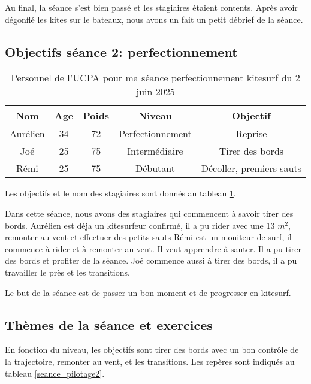 \documentclass[11pt,a4paper]{report}
\begin{document}
Au final, la séance s'est bien passé et les stagiaires étaient contents.
Après avoir dégonflé les kites sur le bateaux, nous avons un fait un
petit débrief de la séance.
\subsection{Objectifs séance 2: perfectionnement}

\begin{table}[h]
\centering
\begin{tabular}{|c|c|c|c|c|}
        \hline
        \textbf{Nom} & \textbf{Age} & \textbf{Poids}& \textbf{Niveau}     &  \textbf{Objectif} \\ 
        \hline
        Aurélien      &  34          &  72           &   Perfectionnement  & Reprise \\
        Joé           &  25          &  75           &   Intermédiaire     & Tirer des bords \\
        Rémi          &  25          & 75            &  Débutant           &  Décoller, premiers sauts  \\
        \hline
\end{tabular}
\caption{Personnel de l'UCPA pour ma séance perfectionnement kitesurf du 2 juin 2025\label{stagiaires_perf}}
\end{table}
Les objectifs et le nom des stagiaires sont donnés au tableau \ref{stagiaires_perf}.

Dans cette séance, nous avons des stagiaires qui commencent à savoir tirer des bords.
Aurélien est déja un kitesurfeur confirmé, il a pu rider avec une 13 $m^2$, 
remonter au vent et effectuer des petits sauts
Rémi est un moniteur de surf, il commence à rider et à remonter au vent. 
Il veut apprendre à sauter.
Il a pu tirer des bords et profiter de la séance.
Joé commence aussi à tirer des bords, il a pu travailler le près et les transitions.

Le but de la séance est de passer un bon moment et de progresser en kitesurf.
\subsection{Thèmes de la séance et exercices}
En fonction du niveau, les objectifs sont tirer des bords avec un bon contrôle de la 
trajectoire, remonter au vent, et les transitions. Les repères sont indiqués
au tableau \ref{seance_pilotage2}.
\end{document}
